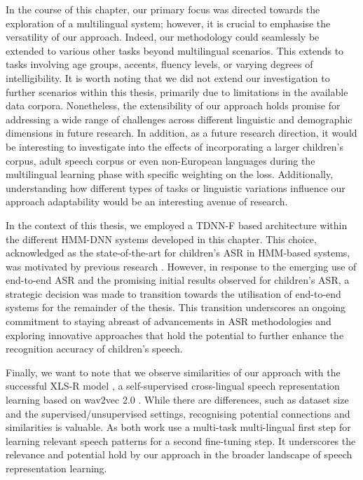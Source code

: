 In the course of this chapter, our primary focus was directed towards the exploration of a multilingual system; however, it is crucial to emphasise the versatility of our approach. Indeed, our methodology could seamlessly be extended to various other tasks beyond multilingual scenarios. This extends to tasks involving age groups, accents, fluency levels, or varying degrees of intelligibility. It is worth noting that we did not extend our investigation to further scenarios within this thesis, primarily due to limitations in the available data corpora. Nonetheless, the extensibility of our approach holds promise for addressing a wide range of challenges across different linguistic and demographic dimensions in future research. In addition, as a future research direction, it would be interesting to investigate into the effects of incorporating a larger children's corpus, adult speech corpus or even non-European languages during the multilingual learning phase with specific weighting on the loss. Additionally, understanding how different types of tasks or linguistic variations influence our approach adaptability would be an interesting avenue of research.

In the context of this thesis, we employed a \ac{TDNN-F} based architecture within the different \ac{HMM-DNN} systems developed in this chapter. This choice, acknowledged as the state-of-the-art for children's \ac{ASR} in \ac{HMM}-based systems, was motivated by previous research \cite{tdnnf-children}. However, in response to the emerging use of end-to-end \ac{ASR} and the promising initial results observed for children's \ac{ASR}, a strategic decision was made to transition towards the utilisation of end-to-end systems for the remainder of the thesis. This transition underscores an ongoing commitment to staying abreast of advancements in \ac{ASR} methodologies and exploring innovative approaches that hold the potential to further enhance the recognition accuracy of children's speech.

Finally, we want to note that we observe similarities of our approach with the  successful XLS-R model \cite{babu2021xlsr}, a self-supervised cross-lingual speech representation learning based on wav2vec 2.0 \cite{baevski2020wav2vec}. While there are differences, such as dataset size and the supervised/unsupervised settings, recognising potential connections and similarities is valuable. As both work use a multi-task multi-lingual first step for learning relevant speech patterns for a second fine-tuning step. It underscores the relevance and potential hold by our approach in the broader landscape of speech representation learning. 
